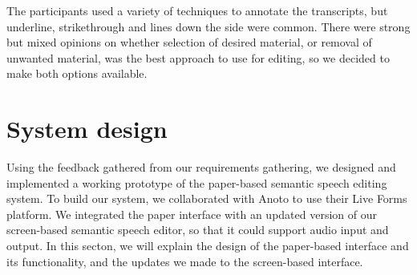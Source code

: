 



The participants used a variety of techniques to annotate the transcripts, but underline, strikethrough and lines down
the side were common. There were strong but mixed opinions on whether selection of desired material, or removal of
unwanted material, was the best approach to use for editing, so we decided to make both options available.


\section{System design}\label{sec:paper-design}





Using the feedback gathered from our requirements gathering, we designed and implemented a working prototype of the
paper-based semantic speech editing system. To build our system, we collaborated with Anoto to use their Live Forms
platform. We integrated the paper interface with an updated version of our screen-based semantic speech editor, so that
it could support audio input and output.  In this secton, we will explain the design of the paper-based interface and
its functionality, and the updates we made to the screen-based interface.

